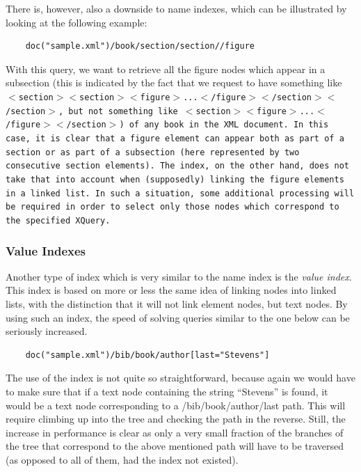 \documentclass[a4paper,10pt]{article}
\begin{document}
There is, however, also a downside to name indexes, which can be illustrated by
looking at the following example:

\begin{verbatim}
    doc("sample.xml")/book/section/section//figure
\end{verbatim}

With this query, we want to retrieve all the figure nodes which appear in a subsection
(this is indicated by the fact that we request to have something like \tt
$<$section$><$section$><$figure$>$...$<$/figure$><$/section$><$/section$>$\normalfont{}, but
not something like \tt{}$<$section$><$figure$>$...$<$/figure$><$/section$>$\normalfont{})
of any book in the XML document. In this case, it is clear that a figure element can
appear both as part of a section or as part of a subsection (here represented by two
consecutive section elements). The index, on the other hand, does not take that into
account when (supposedly) linking the figure elements in a linked list. In such a
situation, some additional processing will be required in order to select only those
nodes which correspond to the specified XQuery.

\subsubsection*{Value Indexes}

Another type of index which is very similar to the name index is the \textit{value
index}. This index is based on more or less the same idea of linking nodes into linked
lists, with the distinction that it will not link element nodes, but text nodes. By using
such an index, the speed of solving queries similar to the one below can be seriously
increased.

\begin{verbatim}
    doc("sample.xml")/bib/book/author[last="Stevens"]
\end{verbatim}

The use of the index is not quite so straightforward, because again we would have to
make sure that if a text node containing the string ``Stevens'' is found, it would be
a text node corresponding to a /bib/book/author/last path. This will require climbing
up into the tree and checking the path in the reverse. Still, the increase in performance
is clear as only a very small fraction of the branches of the tree that correspond to the
above mentioned path will have to be traversed (as opposed to all of them, had the
index not existed).
\end{document}
